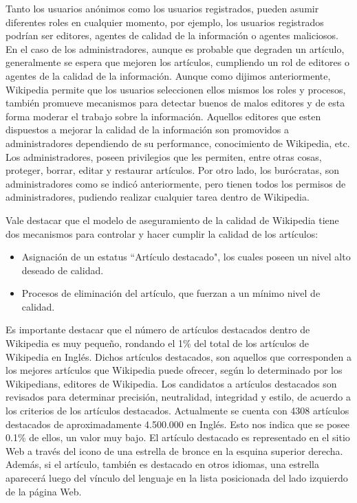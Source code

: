 Tanto los usuarios an\'onimos como los usuarios registrados, pueden asumir diferentes roles en cualquier momento, por ejemplo, los usuarios registrados podr\'ian ser editores, agentes de calidad de la informaci\'on o agentes maliciosos. En el caso de los administradores, aunque es probable que degraden un art\'iculo, generalmente se espera que mejoren los art\'iculos, cumpliendo un rol de editores o agentes de la calidad de la informaci\'on.
Aunque como dijimos anteriormente, Wikipedia permite que los usuarios seleccionen ellos mismos los roles y procesos, tambi\'en promueve mecanismos para detectar buenos de malos editores y de esta forma moderar el trabajo sobre la informaci\'on. Aquellos editores que esten dispuestos a mejorar la calidad de la informaci\'on son promovidos a administradores dependiendo de su performance, conocimiento de Wikipedia, etc. Los administradores, poseen privilegios que les permiten, entre otras cosas, proteger, borrar, editar y restaurar art\'iculos. Por otro lado, los bur\'ocratas, son administradores como se indic\'o anteriormente, pero tienen todos los permisos de administradores, pudiendo realizar cualquier tarea dentro de Wikipedia.

Vale destacar que el modelo de aseguramiento de la calidad de Wikipedia tiene dos mecanismos para controlar y hacer cumplir la calidad de los art\'iculos:

\begin{itemize}
\item Asignaci\'on de un estatus ``Art\'iculo destacado", los cuales poseen un nivel alto deseado de calidad.
\item Procesos de eliminaci\'on del art\'iculo, que fuerzan a un m\'inimo nivel de calidad.
\end{itemize}

Es importante destacar que el n\'umero de art\'iculos destacados dentro de Wikipedia es muy peque\~no, rondando el 1\% del total de los art\'iculos de Wikipedia en Ingl\'es. Dichos art\'iculos destacados, son aquellos que corresponden a los mejores art\'iculos que Wikipedia puede ofrecer, seg\'un lo determinado por los Wikipedians, editores de Wikipedia. Los candidatos a art\'iculos destacados son revisados para determinar precisi\'on, neutralidad, integridad y estilo, de acuerdo a los criterios de los art\'iculos destacados.
Actualmente se cuenta con 4308 art\'iculos destacados de aproximadamente 4.500.000 en Ingl\'es. Esto nos indica que se posee 0.1\% de ellos, un valor muy bajo.
El art\'iculo destacado es representado en el sitio Web a trav\'es del icono de una estrella de bronce en la esquina superior derecha. Adem\'as, si el art\'iculo, tambi\'en es destacado en otros idiomas, una estrella aparecer\'a luego del v\'inculo del lenguaje en la lista posicionada del lado izquierdo de la p\'agina Web.

